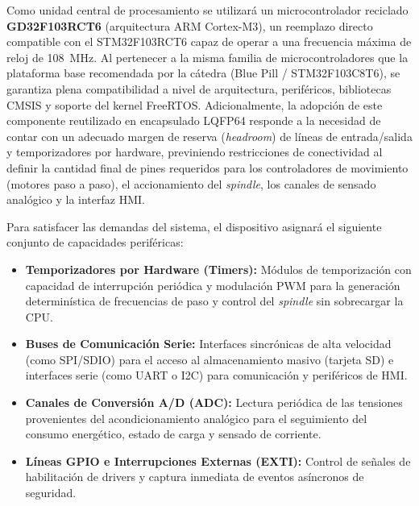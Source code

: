Como unidad central de procesamiento se utilizará un microcontrolador reciclado \textbf{GD32F103RCT6} (arquitectura ARM Cortex-M3), un reemplazo directo compatible con el STM32F103RCT6 capaz de operar a una frecuencia máxima de reloj de \SI{108}{\mega\hertz}. Al pertenecer a la misma familia de microcontroladores que la plataforma base recomendada por la cátedra (Blue Pill / STM32F103C8T6), se garantiza plena compatibilidad a nivel de arquitectura, periféricos, bibliotecas CMSIS y soporte del kernel FreeRTOS. Adicionalmente, la adopción de este componente reutilizado en encapsulado LQFP64 responde a la necesidad de contar con un adecuado margen de reserva (\textit{headroom}) de líneas de entrada/salida y temporizadores por hardware, previniendo restricciones de conectividad al definir la cantidad final de pines requeridos para los controladores de movimiento (motores paso a paso), el accionamiento del \textit{spindle}, los canales de sensado analógico y la interfaz HMI.

Para satisfacer las demandas del sistema, el dispositivo asignará el siguiente conjunto de capacidades periféricas:

\begin{itemize}
  \item \textbf{Temporizadores por Hardware (Timers):} Módulos de temporización con capacidad de interrupción periódica
    y modulación PWM para la generación determinística de frecuencias de paso y control del \textit{spindle} sin sobrecargar la CPU.
  \item \textbf{Buses de Comunicación Serie:} Interfaces sincrónicas de alta velocidad (como SPI/SDIO) para el acceso al
    almacenamiento masivo (tarjeta SD) e interfaces serie (como UART o I2C) para comunicación y periféricos de HMI.
  \item \textbf{Canales de Conversión A/D (ADC):} Lectura periódica de las tensiones provenientes del acondicionamiento analógico
    para el seguimiento del consumo energético, estado de carga y sensado de corriente.
  \item \textbf{Líneas GPIO e Interrupciones Externas (EXTI):} Control de señales de habilitación de drivers y captura
    inmediata de eventos asíncronos de seguridad.
\end{itemize}
